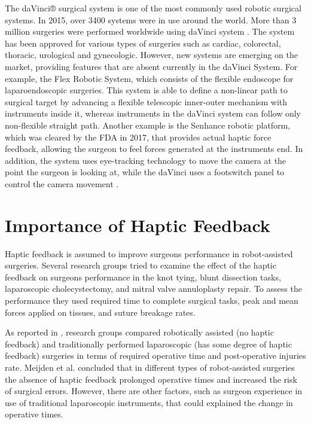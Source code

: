 The daVinci® surgical system is one of the most commonly used robotic surgical systems. In 2015, over 3400 systems were in use around the world. More than 3 million surgeries were performed worldwide using daVinci system \cite{_intuitive_2018}. The system has been approved for various types of surgeries such as cardiac, colorectal, thoracic, urological and gynecologic. However, new systems are emerging on the market, providing features that are absent currently in the daVinci System. For example, the Flex Robotic System, which consists of the flexible endoscope for laparoendoscopic surgeries. This system is able to define a non-linear path to surgical target by advancing a flexible telescopic inner-outer mechanism with instruments inside it, whereas instruments in the daVinci system can follow only non-flexible straight path. Another example is the Senhance robotic platform, which was cleared by the FDA in 2017, that provides actual haptic force feedback, allowing the surgeon to feel forces generated at the instruments end. In addition, the system uses eye-tracking technology to move the camera at the point the surgeon is looking at, while the daVinci uses a footswitch panel to control the camera movement \cite{peters_review_2018}.



\section{Importance of Haptic Feedback}
\label{sec:hapticFeedbackImportance}

Haptic feedback is assumed to improve surgeons performance in robot-assisted surgeries. Several research groups tried to examine the effect of the haptic feedback on surgeons performance in the knot tying, blunt dissection tasks, laparoscopic cholecystectomy, and mitral valve annuloplasty repair. To assess the performance they used required time to complete surgical tasks, peak and mean forces applied on tissues, and suture breakage rates.

As reported in \cite{meijden_value_2009}, research groups \cite{delaney_comparison_2003, morino_randomized_2006, nakadi_evaluation_2006, kornprat_prospective_2006} compared robotically assisted (no haptic feedback) and traditionally performed laparoscopic (has some degree of haptic feedback) surgeries in terms of required operative time and post-operative injuries rate. Meijden et al. concluded that in different types of robot-assisted surgeries the absence of haptic feedback prolonged operative times and increased the risk of surgical errors. However, there are other factors, such as surgeon experience in use of traditional laparoscopic instruments, that could explained the change in operative times.

